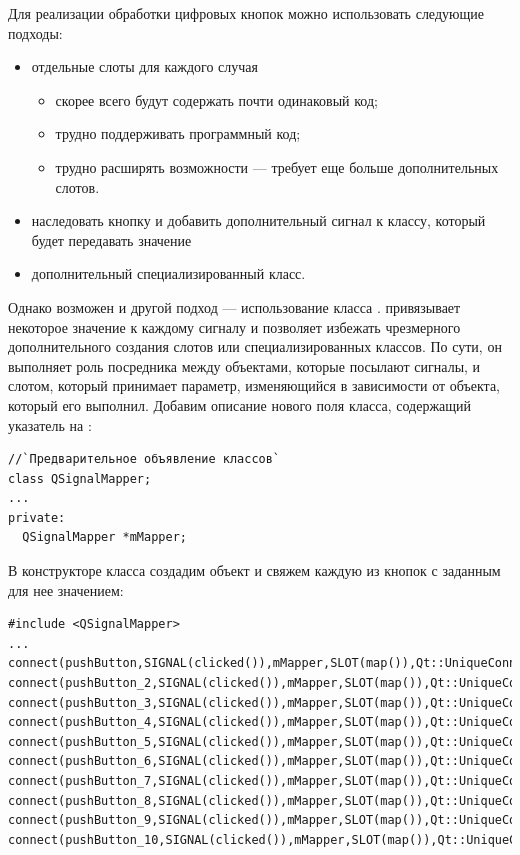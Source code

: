 Для реализации обработки цифровых кнопок можно использовать следующие подходы:

\begin{itemize}
\item отдельные слоты для каждого случая
\begin{itemize}
\item скорее всего будут содержать почти одинаковый код;
\item трудно поддерживать программный код;
\item трудно расширять возможности --- требует еще больше дополнительных слотов.
\end{itemize}
\item наследовать кнопку и добавить дополнительный сигнал к классу, который будет передавать значение 
\item дополнительный специализированный класс.
\end{itemize}

Однако возможен и другой подход --- использование класса .
 привязывает некоторое значение к каждому сигналу и позволяет избежать
чрезмерного дополнительного создания слотов или специализированных классов. По сути, он выполняет роль посредника между
объектами, которые посылают сигналы, и слотом, который принимает параметр, изменяющийся в зависимости от объекта,
который его выполнил. Добавим описание нового поля класса, содержащий указатель на :
\begin{lstlisting}
//`Предварительное объявление классов`
class QSignalMapper;
...
private:
  QSignalMapper *mMapper;
\end{lstlisting}

В конструкторе класса создадим объект и свяжем каждую из кнопок с заданным для нее значением:
\begin{lstlisting}
#include <QSignalMapper>
...
connect(pushButton,SIGNAL(clicked()),mMapper,SLOT(map()),Qt::UniqueConnection);
connect(pushButton_2,SIGNAL(clicked()),mMapper,SLOT(map()),Qt::UniqueConnection);
connect(pushButton_3,SIGNAL(clicked()),mMapper,SLOT(map()),Qt::UniqueConnection);
connect(pushButton_4,SIGNAL(clicked()),mMapper,SLOT(map()),Qt::UniqueConnection);
connect(pushButton_5,SIGNAL(clicked()),mMapper,SLOT(map()),Qt::UniqueConnection);
connect(pushButton_6,SIGNAL(clicked()),mMapper,SLOT(map()),Qt::UniqueConnection);
connect(pushButton_7,SIGNAL(clicked()),mMapper,SLOT(map()),Qt::UniqueConnection);
connect(pushButton_8,SIGNAL(clicked()),mMapper,SLOT(map()),Qt::UniqueConnection);
connect(pushButton_9,SIGNAL(clicked()),mMapper,SLOT(map()),Qt::UniqueConnection);
connect(pushButton_10,SIGNAL(clicked()),mMapper,SLOT(map()),Qt::UniqueConnection);
\end{lstlisting}

